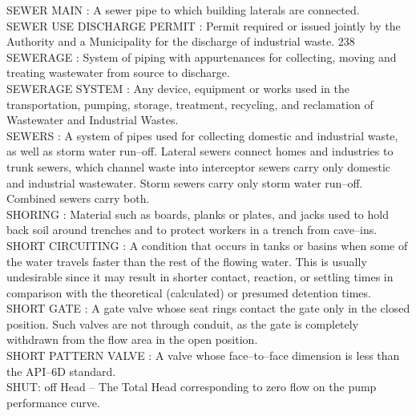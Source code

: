 \vspace{0.15cm}
SEWER MAIN :  A sewer pipe to which building laterals are connected. \\
\vspace{0.15cm}
SEWER USE DISCHARGE PERMIT :  Permit required or issued jointly by the Authority and a Municipality for the discharge of industrial waste. 238 \\
\vspace{0.15cm}
SEWERAGE :  System of piping with appurtenances for collecting, moving and treating wastewater from source to discharge. \\
\vspace{0.15cm}
SEWERAGE SYSTEM :  Any device, equipment or works used in the transportation, pumping, storage, treatment, recycling, and reclamation of Wastewater and Industrial Wastes. \\
\vspace{0.15cm}
SEWERS :   A system of pipes used for collecting domestic and industrial waste, as well as storm water run–off. Lateral sewers connect homes and industries to trunk sewers, which channel waste into interceptor sewers carry only domestic and industrial wastewater. Storm sewers carry only storm water run–off. Combined sewers carry both.\\
\vspace{0.15cm}
SHORING :  Material such as boards, planks or plates, and jacks used to hold back soil around trenches and to protect workers in a trench from cave–ins. \\
\vspace{0.15cm}
SHORT CIRCUITING :  A condition that occurs in tanks or basins when some of the water travels faster than the rest of the flowing water. This is usually undesirable since it may result in shorter contact, reaction, or settling times in comparison with the theoretical (calculated) or presumed detention times.\\
\vspace{0.15cm}
SHORT GATE :   A gate valve whose seat rings contact the gate only in the closed position. Such valves are not through conduit, as the gate is completely withdrawn from the flow area in the open position.\\
\vspace{0.15cm}
SHORT PATTERN VALVE :   A valve whose face–to–face dimension is less than the API–6D standard.\\
\vspace{0.15cm}
SHUT: off Head –  The Total Head corresponding to zero flow on the pump performance curve.\\
